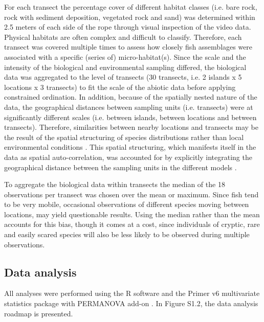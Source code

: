 For each transect the percentage cover of different habitat classes (i.e. bare rock, rock with sediment deposition, vegetated rock and sand) was determined within 2.5 meters of each side of the rope through visual inspection of the video data. Physical habitats are often complex and difficult to classify. Therefore, each transect was covered multiple times to assess how closely fish assemblages were associated with a specific (series of) micro-habitat(s). Since the scale and the intensity of the biological and environmental sampling differed, the biological data was aggregated to the level of transects (30 transects, i.e. 2 islands x 5 locations x 3 transects) to fit the scale of the abiotic data before applying constrained ordination. In addition, because of the spatially nested nature of the data, the geographical distances between sampling units (i.e. transects) were at significantly different scales (i.e. between islands, between locations and between transects). Therefore, similarities between nearby locations and transects may be the result of the spatial structuring of species distributions rather than local environmental conditions \citep{Guisan2006,Kissling2008SpatialModels,Legendre1993SpatialParadigm}. This spatial structuring, which manifests itself in the data as spatial auto-correlation, was accounted for by explicitly integrating the geographical distance between the sampling units in the different models \citep{Legendre1993SpatialParadigm}. 

To aggregate the biological data within transects the median of the 18 observations per transect was chosen over the mean or maximum. Since fish tend to be very mobile, occasional observations of different species moving between locations, may yield questionable results. Using the median rather than the mean accounts for this bias, though it comes at a cost, since individuals of cryptic, rare and easily scared species will also be less likely to be observed during multiple observations.

\subsection{Data analysis}

All analyses were performed using the R software \citep{RCoreTeam2019R:Computing} and the Primer v6 multivariate statistics package \citep{Clarke2006PRIMERManual/Tutorial} with PERMANOVA add-on \citep{Anderson2008PERMANOVA+Methods}. In Figure S1.2, the data analysis roadmap is presented. 

